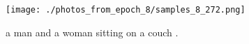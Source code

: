 \documentclass{article}%
\begin{document}
%


\begin{figure}[h!]%
\centering%
\texttt{[image: ./photos\_from\_epoch\_8/samples\_8\_272.png]}%
\caption{a man and a woman sitting on a couch .}%
\end{figure}

%
\end{document}
